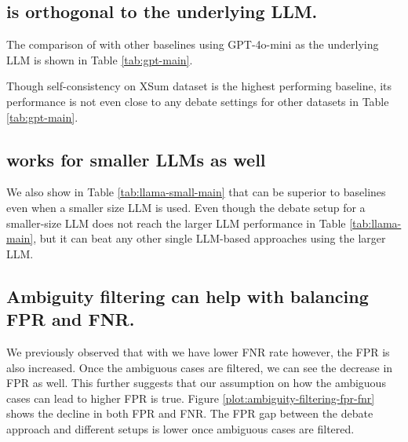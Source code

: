 \subsection{\method is orthogonal to the underlying LLM.}\label{app:results:gpt4}
The comparison of \method with other baselines using GPT-4o-mini as the underlying LLM is shown in Table \ref{tab:gpt-main}.

Though self-consistency on XSum dataset is the highest performing baseline, its performance is not even close to any debate settings for other datasets in Table \ref{tab:gpt-main}.

\subsection{\method works for smaller LLMs as well}\label{app:results:llama-small}
We also show in Table \ref{tab:llama-small-main} that \method can be superior to baselines even when a smaller size LLM is used.
Even though the debate setup for a smaller-size LLM does not reach the larger LLM performance in Table \ref{tab:llama-main}, but it can beat any other single LLM-based approaches using the larger LLM.



\subsection{Ambiguity filtering can help with balancing FPR and FNR.}\label{app:results:fpr-fnr-filtered}
We previously observed that with \method we have lower FNR rate however, the FPR is also increased. 
Once the ambiguous cases are filtered, we can see the decrease in FPR as well. This further suggests that our assumption on how the ambiguous cases can lead to higher FPR is true.
Figure \ref{plot:ambiguity-filtering-fpr-fnr} shows the decline in both FPR and FNR. The FPR gap between the debate approach and different setups is lower once ambiguous cases are filtered.

